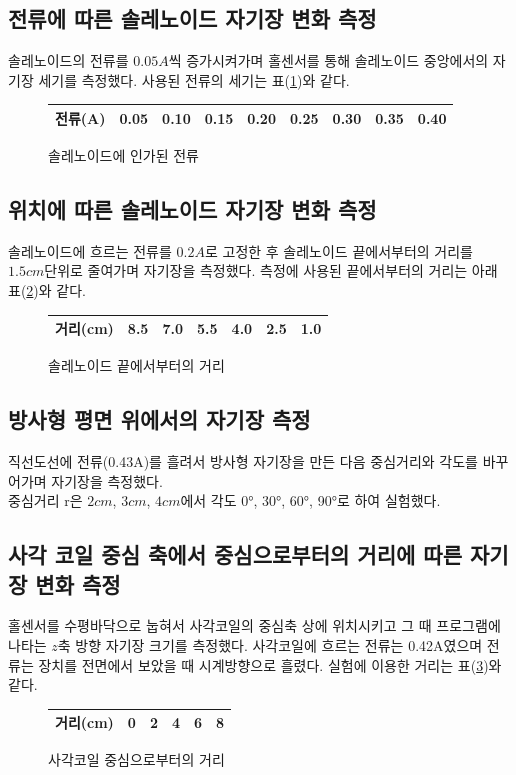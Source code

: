 \documentclass[a4paper]{article}
\begin{document}
	\subsection{전류에 따른 솔레노이드 자기장 변화 측정}
		솔레노이드의 전류를 $0.05\si{A}$씩 증가시켜가며 홀센서를 통해 솔레노이드 중앙에서의 자기장 세기를 측정했다.
		사용된 전류의 세기는 표(\ref{tab:soli})와 같다.
		\begin{figure}[h]
			\centering
			\begin{tabular}{c|cccccccc}
				\hline \hline
				전류(A) & 0.05 & 0.10 & 0.15 & 0.20 & 0.25 & 0.30 & 0.35 & 0.40 \\
				\hline \hline 
			\end{tabular}
			\caption{솔레노이드에 인가된 전류}
			\label{tab:soli}
		\end{figure} 

	\subsection{위치에 따른 솔레노이드 자기장 변화 측정}
		솔레노이드에 흐르는 전류를 $0.2\si{A}$로 고정한 후 솔레노이드 끝에서부터의 거리를 $1.5\si{cm}$단위로 줄여가며 자기장을 측정했다.
		측정에 사용된 끝에서부터의 거리는 아래 표(\ref{tab:sold})와 같다.
		\begin{figure}[h]
			\centering
			\begin{tabular}{c|cccccc}
				\hline \hline
				거리(\si{cm}) & 8.5 & 7.0 & 5.5 & 4.0 & 2.5 & 1.0 \\
				\hline \hline
			\end{tabular}
			\caption{솔레노이드 끝에서부터의 거리}
			\label{tab:sold}
		\end{figure}

	\subsection{방사형 평면 위에서의 자기장 측정}
		직선도선에 전류(0.43\si{A})를 흘려서 방사형 자기장을 만든 다음 중심거리와 각도를 바꾸어가며 자기장을 측정했다. \\
		중심거리 r은 $2\si{cm}$, $3\si{cm}$, $4\si{cm}$에서 각도 \ang{0}, \ang{30}, \ang{60}, \ang{90}로 하여 실험했다.

	\subsection{사각 코일 중심 축에서 중심으로부터의 거리에 따른 자기장 변화 측정}
		홀센서를 수평바닥으로 눕혀서 사각코일의 중심축 상에 위치시키고 그 때 프로그램에 나타는 $z$축 방향 자기장 크기를 측정했다.
		사각코일에 흐르는 전류는 0.42\si{A}였으며 전류는 장치를 전면에서 보았을 때 시계방향으로 흘렸다.
		실험에 이용한 거리는 표(\ref{tab:sagak})와 같다.
		\begin{figure}[h]
			\centering
			\begin{tabular}{c|ccccc}
				\hline \hline
				거리(\si{cm}) & 0 & 2 & 4 & 6 & 8 \\
				\hline \hline
			\end{tabular}
			\caption{사각코일 중심으로부터의 거리}
			\label{tab:sagak}
		\end{figure}
\end{document}
